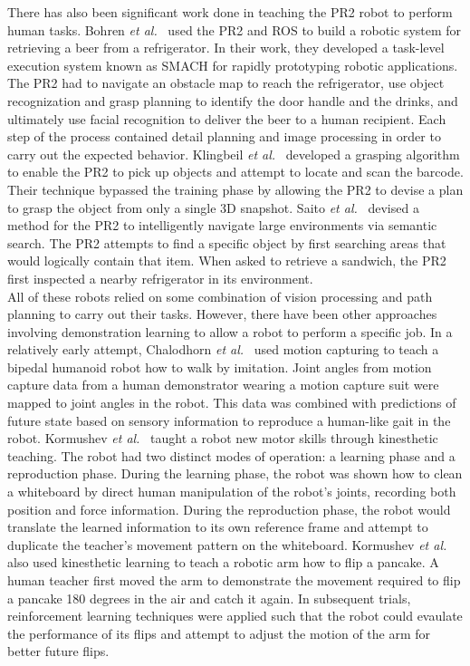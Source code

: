 \documentclass{sig-alternate}
\begin{document}
There has also been significant work done in teaching the PR2 robot to perform human tasks. Bohren \textit{et al.}~\cite{beer} used the PR2 and ROS to build a robotic system for retrieving a beer from a refrigerator. In their work, they developed a task-level execution system known as SMACH for rapidly prototyping robotic applications. The PR2 had to navigate an obstacle map to reach the refrigerator, use object recognization and grasp planning to identify the door handle and the drinks, and ultimately use facial recognition to deliver the beer to a human recipient. Each step of the process contained detail planning and image processing in order to carry out the expected behavior. Klingbeil \textit{et al.}~\cite{groceries} developed a grasping algorithm to enable the PR2 to pick up objects and attempt to locate and scan the barcode. Their technique bypassed the training phase by allowing the PR2 to devise a plan to grasp the object from only a single 3D snapshot. Saito \textit{et al.}~\cite{subway} devised a method for the PR2 to intelligently navigate large environments via semantic search. The PR2 attempts to find a specific object by first searching areas that would logically contain that item. When asked to retrieve a sandwich, the PR2 first inspected a nearby refrigerator in its environment.\\ 

All of these robots relied on some combination of vision processing and path planning to carry out their tasks. However, there have been other approaches involving demonstration learning to allow a robot to perform a specific job. In a relatively early attempt, Chalodhorn \textit{et al.}~\cite{walk_imitation} used motion capturing to teach a bipedal humanoid robot how to walk by imitation. Joint angles from motion capture data from a human demonstrator wearing a motion capture suit were mapped to joint angles in the robot. This data was combined with predictions of future state based on sensory information to reproduce a human-like gait in the robot. Kormushev \textit{et al.}~\cite{whiteboard} taught a robot new motor skills through kinesthetic teaching. The robot had two distinct modes of operation: a learning phase and a reproduction phase. During the learning phase, the robot was shown how to clean a whiteboard by direct human manipulation of the robot's joints, recording both position and force information. During the reproduction phase, the robot would translate the learned information to its own reference frame and attempt to duplicate the teacher's movement pattern on the whiteboard.  Kormushev \textit{et al.}~\cite{pancakes} also used kinesthetic learning to teach a robotic arm how to flip a pancake. A human teacher first moved the arm to demonstrate the movement required to flip a pancake 180 degrees in the air and catch it again. In subsequent trials, reinforcement learning techniques were applied such that the robot could evaulate the performance of its flips and attempt to adjust the motion of the arm for better future flips.
\end{document}
